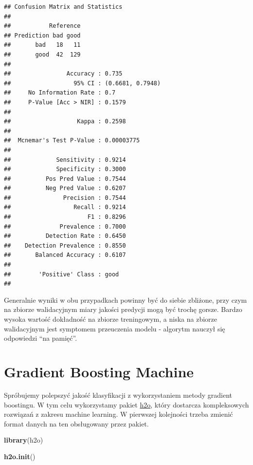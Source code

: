\documentclass[
]{book}
\newenvironment{Shaded}{\begin{snugshade}}{\end{snugshade}}
\newcommand{\KeywordTok}[1]{\textcolor[rgb]{0.13,0.29,0.53}{\textbf{#1}}}
\newcommand{\NormalTok}[1]{#1}
\begin{document}
\begin{verbatim}
## Confusion Matrix and Statistics
## 
##           Reference
## Prediction bad good
##       bad   18   11
##       good  42  129
##                                           
##                Accuracy : 0.735           
##                  95% CI : (0.6681, 0.7948)
##     No Information Rate : 0.7             
##     P-Value [Acc > NIR] : 0.1579          
##                                           
##                   Kappa : 0.2598          
##                                           
##  Mcnemar's Test P-Value : 0.00003775      
##                                           
##             Sensitivity : 0.9214          
##             Specificity : 0.3000          
##          Pos Pred Value : 0.7544          
##          Neg Pred Value : 0.6207          
##               Precision : 0.7544          
##                  Recall : 0.9214          
##                      F1 : 0.8296          
##              Prevalence : 0.7000          
##          Detection Rate : 0.6450          
##    Detection Prevalence : 0.8550          
##       Balanced Accuracy : 0.6107          
##                                           
##        'Positive' Class : good            
## 
\end{verbatim}

Generalnie wyniki w obu przypadkach powinny być do siebie zbliżone, przy czym na zbiorze walidacyjnym miary jakości predycji mogą być trochę gorsze. Bardzo wysoka wartość dokładność na zbiorze treningowym, a niska na zbiorze walidacyjnym jest symptomem przeuczenia modelu - algorytm nauczył się odpowiedzi ``na pamięć''.

\hypertarget{gradient-boosting-machine}{%
\section{Gradient Boosting Machine}\label{gradient-boosting-machine}}

Spróbujemy polepszyć jakość klasyfikacji z wykorzystaniem metody gradient boostingu. W tym celu wykorzystamy pakiet \href{https://www.h2o.ai/}{h2o}, który dostarcza kompleksowych rozwiązań z zakresu machine learning. W pierwszej kolejności trzeba zmienić format danych na ten obsługowany przez pakiet.

\begin{Shaded}
\begin{Highlighting}[]
\KeywordTok{library}\NormalTok{(h2o)}

\KeywordTok{h2o.init}\NormalTok{()}
\end{Highlighting}
\end{Shaded}
\end{document}
